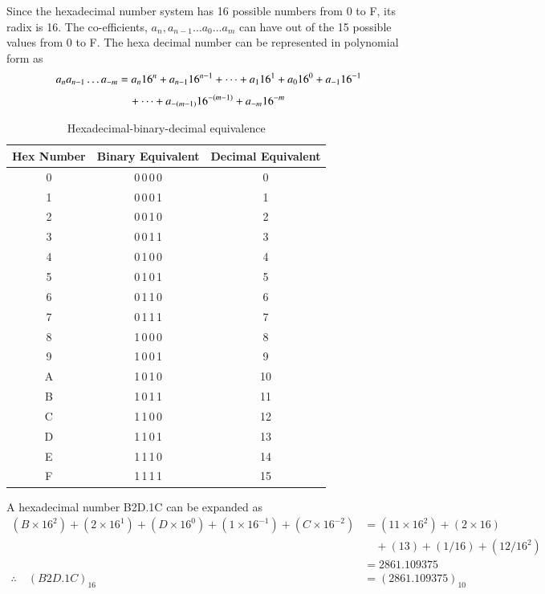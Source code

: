Since the hexadecimal number system has 16 possible numbers from 0 to F, its radix is 16. The co-efficients, $a_{n},a_{n-1}\ldots a_{0}\ldots a_{m}$ can have out of the 15 possible values from 0 to F. The hexa decimal number can be represented in polynomial form as
\begin{align}
a_{n}a_{n-1}\ldots a_{-m} &= a_{n}16^{n}+a_{n-1}16^{n-1}+\cdots+a_{1}16^{1}+a_{0}16^{0}+a_{-1}16^{-1}\notag\\[3pt]
&\quad +\cdots+a_{-(m-1)}16^{-(m-1)}+a_{-m}16^{-m}\label{eq6.5}
\end{align}
\begin{table}[H]
\centering
\caption{Hexadecimal-binary-decimal equivalence}\label{tab6.2}
\begin{tabular}{|c|c|c|}
\hline
{\bf Hex Number} & {\bf Binary Equivalent} & {\bf Decimal Equivalent}\\
\hline
0 & 0\,0\,0\,0 & 0\\
\hline
1 & 0\,0\,0\,1 & 1\\
\hline
2 & 0\,0\,1\,0 & 2\\
\hline
3 & 0\,0\,1\,1 & 3\\
\hline
4 & 0\,1\,0\,0 & 4\\
\hline
5 & 0\,1\,0\,1 & 5\\
\hline
6 & 0\,1\,1\,0 & 6\\
\hline
7 & 0\,1\,1\,1 & 7\\
\hline
8 & 1\,0\,0\,0 & 8\\
\hline
9 & 1\,0\,0\,1 & 9\\
\hline
A & 1\,0\,1\,0 & 10\\
\hline
B & 1\,0\,1\,1 & 11\\
\hline
C & 1\,1\,0\,0 & 12\\
\hline
D & 1\,1\,0\,1 & 13\\
\hline
E & 1\,1\,1\,0 & 14\\
\hline
F & 1\,1\,1\,1 & 15\\
\hline
\end{tabular}
\end{table}

A hexadecimal number B2D.1C can be expanded as
\begin{align*}
(B\times 16^{2})+(2\times 16^{1})+(D\times 16^{0})+(1\times 16^{-1})+(C\times 16^{-2}) &= (11\times 16^{2})+(2\times 16)\\[3pt]
&\quad +(13)+(1/16)+(12/16^{2})\\[3pt]
&= 2861.109375\\[3pt]
\therefore\quad (B2D.1C)_{16} &= (2861.109375)_{10}
\end{align*}

